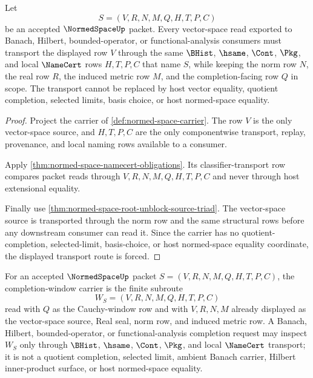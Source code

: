 \begin{theorem}
\label{thm:normed-space-vector-transport-obligation}
Let
$$
S=(V,R,N,M,Q,H,T,P,C)
$$
be an accepted $\NormedSpaceUp$ packet. Every vector-space read exported to Banach, Hilbert, bounded-operator, or functional-analysis consumers must transport the displayed row $V$ through the same $\BHist$, $\hsame$, $\Cont$, $\Pkg$, and local $\NameCert$ rows $H,T,P,C$ that name $S$, while keeping the norm row $N$, the real row $R$, the induced metric row $M$, and the completion-facing row $Q$ in scope. The transport cannot be replaced by host vector equality, quotient completion, selected limits, basis choice, or host normed-space equality.
\end{theorem}
\begin{proof}
Project the carrier of \autoref{def:normed-space-carrier}. The row $V$ is the only vector-space source, and $H,T,P,C$ are the only componentwise transport, replay, provenance, and local naming rows available to a consumer.

Apply \autoref{thm:normed-space-namecert-obligations}. Its classifier-transport row compares packet reads through $V,R,N,M,Q,H,T,P,C$ and never through host extensional equality.

Finally use \autoref{thm:normed-space-root-unblock-source-triad}. The vector-space source is transported through the norm row and the same structural rows before any downstream consumer can read it. Since the carrier has no quotient-completion, selected-limit, basis-choice, or host normed-space equality coordinate, the displayed transport route is forced.
\end{proof}

\begin{definition}
\label{def:normed-space-completion-window-carrier}
For an accepted $\NormedSpaceUp$ packet $S=(V,R,N,M,Q,H,T,P,C)$, the completion-window carrier is the finite subroute
$$
W_S=(V,R,N,M,Q,H,T,P,C)
$$
read with $Q$ as the Cauchy-window row and with $V,R,N,M$ already displayed as the vector-space source, Real seal, norm row, and induced metric row. A Banach, Hilbert, bounded-operator, or functional-analysis completion request may inspect $W_S$ only through $\BHist$, $\hsame$, $\Cont$, $\Pkg$, and local $\NameCert$ transport; it is not a quotient completion, selected limit, ambient Banach carrier, Hilbert inner-product surface, or host normed-space equality.
\end{definition}

